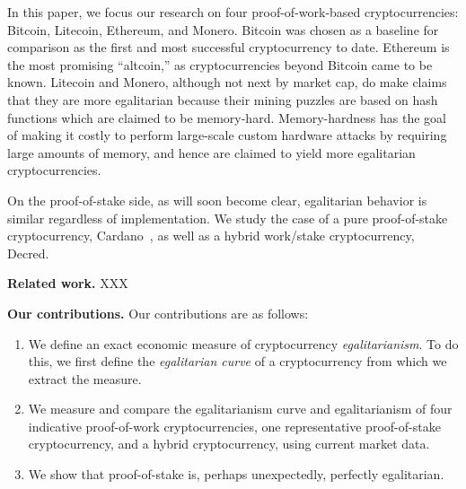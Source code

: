 In this paper, we focus our research on four proof-of-work-based
cryptocurrencies: Bitcoin, Litecoin, Ethereum, and Monero. Bitcoin was chosen as
a baseline for comparison as the first and most successful cryptocurrency to
date. Ethereum is the most promising ``altcoin,'' as cryptocurrencies beyond
Bitcoin came to be known. Litecoin and Monero, although not next by market cap,
do make claims that they are more egalitarian because their mining puzzles are
based on hash functions which are claimed to be memory-hard. Memory-hardness
has the goal of making it costly to perform large-scale custom hardware attacks
by requiring large amounts of memory, and hence are claimed to yield more
egalitarian cryptocurrencies.

On the proof-of-stake side, as will soon become clear, egalitarian behavior is
similar regardless of implementation. We study the case of a pure proof-of-stake
cryptocurrency, Cardano~\cite{ouroboros}, as well as a hybrid work/stake
cryptocurrency, Decred.

\noindent
\textbf{Related work.} XXX

\noindent
\textbf{Our contributions.}
Our contributions are as follows:

\begin{enumerate}
  \item We define an exact economic measure of cryptocurrency
        \emph{egalitarianism}.
        To do this, we first define the \emph{egalitarian curve} of a
        cryptocurrency from which we extract the measure.
  \item We measure and compare the egalitarianism curve and egalitarianism of
        four indicative proof-of-work cryptocurrencies, one representative
        proof-of-stake cryptocurrency, and a hybrid cryptocurrency, using
        current market data.
  \item We show that proof-of-stake is, perhaps unexpectedly, perfectly
        egalitarian.
\end{enumerate}
